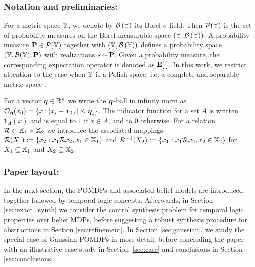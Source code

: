 \documentclass{ifacconf}
\newcommand{\ind}{\mathbf{1}}
\begin{document}
\subsubsection{Notation and preliminaries:}

For a metric space ${\mathbb{Y}}$, we denote by $\mathcal{B}\left({\mathbb{Y}}\right)$ its Borel $\sigma$-field. Then $\mathcal P({\mathbb{Y}})$ is the set of probability measures on the Borel-measurable space $({\mathbb{Y}},\mathcal{B}\left({\mathbb{Y}}\right))$. A probability measure $\mathbf{P} \in \mathcal P({\mathbb{Y}})$ together with $({\mathbb{Y}},\mathcal{B}\left({\mathbb{Y}}\right))$ defines a probability space $({\mathbb{Y}},\mathcal{B}({\mathbb{Y}}),\mathbf{P})$ with realizations $s{\,\sim\,}\mathbf{P}$. Given a probability measure, the corresponding expectation operator is denoted as $\mathbf{E}[\cdot]$. In this work, we restrict attention to the case when ${\mathbb{Y}}$ is a Polish space, i.e, a complete and separable metric space \citep{bogachev2007measure}.

For a vector ${\boldsymbol{\eta}}  \in \mathbb{R}^n$ we write the ${\boldsymbol{\eta}}$-ball in infinity norm as $\mathcal{O}_{\boldsymbol{\eta}}(x_0) = \{ x : |x_i - x_{0,i}| \leq {\boldsymbol{\eta}}_i \}$. The indicator function for a set $A$ is written $\ind_A(x)$ and is equal to $1$ if $x \in A$, and to 0 otherwise. For a relation $\mathcal{R} \subset {\mathbb{X}}_1 \times {\mathbb{X}}_2$ we introduce the associated mappings $\mathcal{R}(X_1):=\{x_2: x_1\mathcal{R} x_2, x_1 \in {\mathbb{X}}_1\}$ and  $\mathcal{R}^{-1}( X_2 ):=\{x_1: x_1\mathcal{R} x_2, x_2 \in {\mathbb{X}}_2 \}$ for $X_1 \subseteq {\mathbb{X}}_1$ and $X_2 \subseteq {\mathbb{X}}_2$.


\subsubsection{Paper layout:}

In the next section, the POMDPs and associated belief models are introduced together followed by temporal logic concepts. Afterwards, in Section \ref{sec:exact_synth} we consider the control synthesis problem for temporal logic properties over belief MDPs, before suggesting a robust synthesis procedure for abstractions in Section \ref{sec:refinement}. In Section \ref{sec:gaussian}, we study the special case of Gaussian POMDPs in more detail, before concluding the paper with an illustrative case study in Section~\ref{sec:case} and conclusions in Section \ref{sec:conclusions}.
\end{document}
